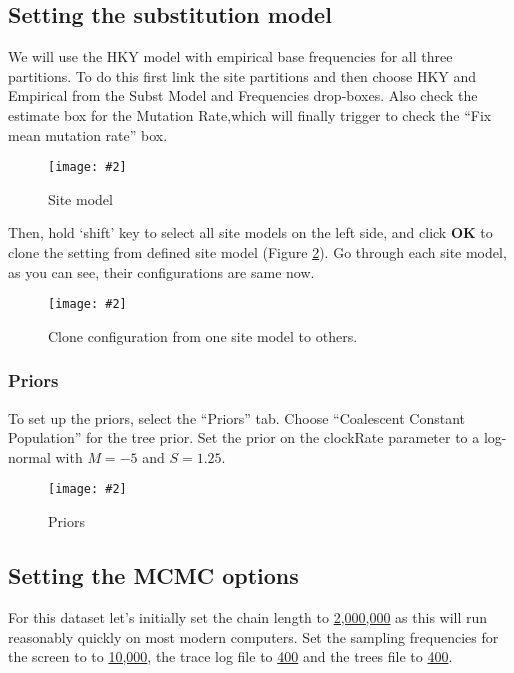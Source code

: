 \documentclass[12pt]{article}
\newcommand{\includeimage}[2][]{%
\texttt{[image: \#2]}
}
\newcommand{\chainLength}{{2,000,000}}
\newcommand{\logEvery}{{400}}
\newcommand{\screenEvery}{{10,000}}
\begin{document}
\subsection*{Setting the substitution model}
We will use the HKY model with empirical base frequencies for all three partitions. To do this first link the site partitions and then choose HKY and Empirical from the Subst Model and Frequencies drop-boxes. Also check the estimate box for the Mutation Rate,which will finally trigger to check the ``Fix mean mutation rate'' box. 

\begin{figure}
\centering	
\includeimage[width=0.8\textwidth]{figures/BEAUti_Site_Model}
\label{fig:BEAUti_Site_Model}
\caption{Site model}
\end{figure}

Then, hold `shift' key to select all site models on the left side, and click \textbf{OK} to clone the setting from defined site model (Figure \ref{fig:cloneFrom}). Go through each site model, as you can see, their configurations are same now. 

\begin{figure}
\centering	
\includeimage[width=0.8\textwidth]{figures/cloneFrom}
\caption{Clone configuration from one site model to others.}
\label{fig:cloneFrom}
\end{figure}


\subsubsection{Priors }

To set up the priors, select the ``Priors'' tab.
Choose ``Coalescent Constant Population'' for the tree prior. Set the prior on the clockRate parameter to a log-normal with $M=-5$ and $S=1.25$. 

\begin{figure}
\centering	
\includeimage[width=0.8\textwidth]{figures/BEAUti_priors}
\label{fig:BEAUti_priors}
\caption{Priors}
\end{figure}


\subsection{Setting the MCMC options}

For this dataset let's initially set the chain length to \underline{\chainLength{}} as this will run 
reasonably quickly on most modern computers. Set the sampling frequencies for the screen to
to \underline{\screenEvery{}}, the trace log file to \underline{\logEvery{}} and the trees file to \underline{\logEvery{}}.
\end{document}
